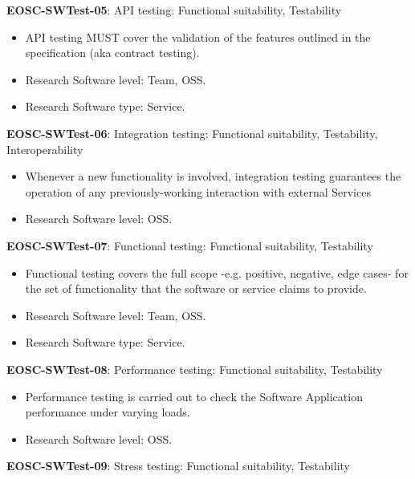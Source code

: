 \textbf{EOSC-SWTest-05}: API testing: Functional suitability, Testability

\begin{itemize}
    \item API testing MUST cover the validation of the features outlined in the specification (aka contract testing). \cite{orviz_fernandez_eosc-synergy_2020}
    \item Research Software level: Team, OSS.
    \item Research Software type: Service.
\end{itemize}

\textbf{EOSC-SWTest-06}: Integration testing: Functional suitability, Testability, Interoperability

\begin{itemize}
    \item Whenever a new functionality is involved, integration testing guarantees the operation of any previously-working interaction with external Services \cite{iso_25010_2011_2017,orviz_fernandez_eosc-synergy_2020}
    \item Research Software level: OSS.
\end{itemize}

\textbf{EOSC-SWTest-07}: Functional testing: Functional suitability, Testability

\begin{itemize}
    \item Functional testing covers the full scope -e.g. positive, negative, edge cases- for the set of functionality that the software or service claims to provide. \cite{iso_25010_2011_2017,orviz_fernandez_eosc-synergy_2020}
    \item Research Software level: Team, OSS.
    \item Research Software type: Service.
\end{itemize}

\textbf{EOSC-SWTest-08}: Performance testing: Functional suitability, Testability

\begin{itemize}
    \item Performance testing is carried out to check the Software Application performance under varying loads. \cite{iso_25010_2011_2017,orviz_fernandez_eosc-synergy_2020}
    \item Research Software level: OSS.
\end{itemize}

\textbf{EOSC-SWTest-09}: Stress testing: Functional suitability, Testability

